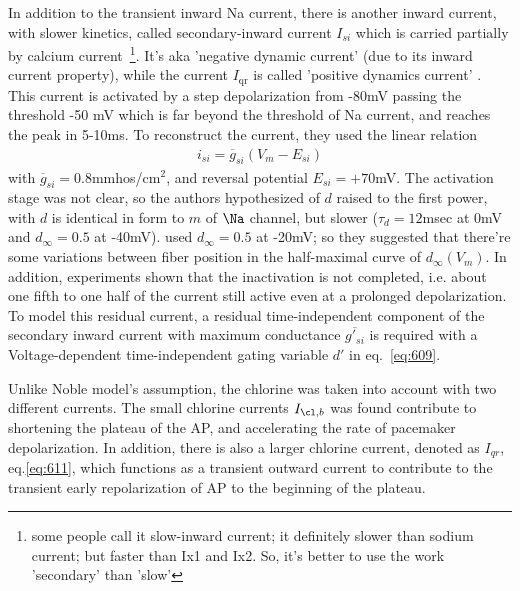 In addition to the transient inward Na current, there is another inward current,
with slower kinetics, called secondary-inward current $I_{si}$ which is carried
partially by calcium current~\citep{johnson1971hec, reuter1973dcc}\footnote{some
people call it slow-inward current; it definitely slower than sodium current;
but faster than Ix1 and Ix2. So, it's better to use the work 'secondary' than
'slow'}. It's aka 'negative dynamic current' (due to its inward current
property), while the current $I_\text{qr}$ is called 'positive dynamics current'
\citep{trautwein1973mcc}.  This current is activated by a step depolarization
from -80mV passing the threshold -50 mV which is far beyond the threshold of Na
current, and reaches the peak in 5-10ms. To reconstruct the current, they used
the linear relation
    \begin{eqnarray*}
      i_{si} = \overline{g}_{si}(V_m-E_{si})
    \end{eqnarray*}
with $\overline{g}_{si}=0.8$mmhos/cm$^2$, and reversal potential $E_{si}=+70$mV.     
The activation stage was not clear, so the authors hypothesized of
$d$ raised to the first power, with $d$ is identical in form to $m$ of $\Na$
channel, but slower ($\tau_d=12$msec at 0mV and $d_\infty=0.5$ at -40mV). 
\citep{vitek1971} used $d_\infty=0.5$ at -20mV; so they suggested that there're
some variations between fiber position in the half-maximal curve of
$d_\infty(V_m)$. In addition, experiments shown that the inactivation is not
completed, i.e. 
about one fifth to one half of the current still active even at a prolonged
depolarization. To model this residual current, a residual time-independent
component of the secondary inward current with maximum conductance
$\overline{g'_{si}}$ is required with a Voltage-dependent time-independent
gating variable $d'$ in eq.~\eqref{eq:609}.

Unlike Noble model's assumption, the chlorine was taken into account with two
different currents. The small chlorine currents $I_{\cl,b}$ was found contribute
to shortening the plateau of the AP, and accelerating the rate of pacemaker
depolarization.  In addition, there is also a larger chlorine current, denoted
as $I_{qr}$, eq.\eqref{eq:611}, which functions as a transient outward current
to contribute to the transient early repolarization of AP to the beginning of
the plateau.

